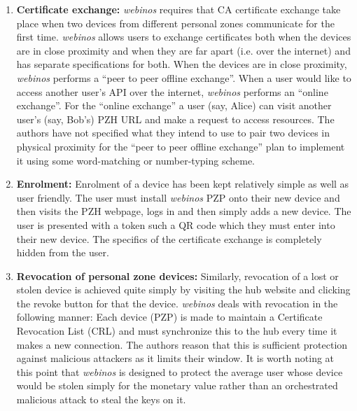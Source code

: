 \begin{enumerate}[label=\arabic*., wide, labelwidth=!, labelindent=0pt]
	\item \textbf{Certificate exchange:} \textit{webinos} requires that CA certificate exchange take place when two devices from different 						personal zones communicate for the first time. \textit{webinos} allows users to exchange certificates both when the devices are in close 					proximity and when they are far apart (i.e. over the internet) and has separate specifications for both. When the devices are in close 							proximity, \textit{webinos} performs a ``peer to peer offline exchange''. When a user would like to access another user's API over the 						internet, \textit{webinos} performs an ``online exchange''. For the ``online exchange'' a user (say, Alice) can visit another user's (say, Bob's) 			PZH URL and make a request to access resources. The authors have not specified what they intend to use to pair two devices in physical 					proximity for the ``peer to peer offline exchange''  plan to implement it using some word-matching or number-typing scheme. 
	
	\item \textbf{Enrolment:} Enrolment of a device has been kept relatively simple as well as user friendly. The user must install \textit{webinos} 			PZP onto their new device and then visits the PZH webpage, logs in and then simply adds a new device. The user is presented with a token such 	a 	QR code which they must enter into their new device. The specifics of the certificate exchange is completely hidden from the user.\\
	
	\item \textbf{Revocation of personal zone devices:} Similarly, revocation of a lost or stolen device is achieved quite simply by visiting the hub 				website and clicking the revoke button for that the device. \textit{webinos} deals with revocation in the following manner: Each device (PZP) is 			made to maintain a Certificate Revocation List (CRL) and must synchronize this to the hub every time it makes a new connection. The authors 			reason that this is sufficient protection against malicious attackers as it limits their window. It is worth noting at this point that \textit{webinos} 		is 	designed to protect the average user whose device would be stolen simply for the monetary value rather than an orchestrated malicious 					attack to steal the keys on it.\\
	

\end{enumerate}
